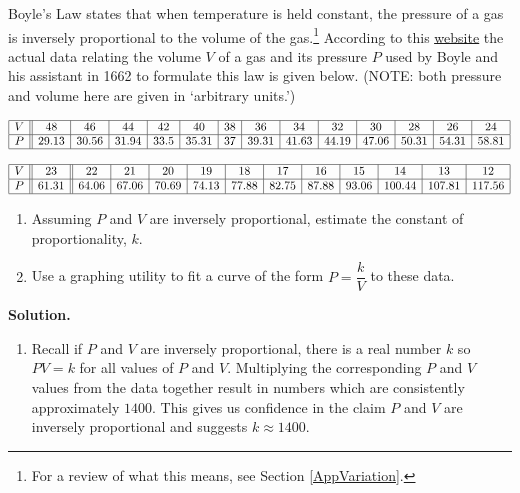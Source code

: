 \documentclass{ximera}
\begin{document}
\begin{example}  \label{BoyleslawRational} Boyle's Law states that when temperature is held constant, the pressure of a gas is inversely proportional to the volume of the gas.\footnote{For a review of what this means, see Section \ref{AppVariation}.}  According to this \href{http://web.lemoyne.edu/~giunta/classicalcs/boyleverify.html}{\underline{website}} the actual data relating the volume $V$ of a gas and its pressure $P$ used by Boyle and his assistant in 1662 to formulate this law is given below. (NOTE: both pressure and volume here are given in `arbitrary units.')

\[ \begin{array}{|c||c|c|c|c|c|c|c|c|c|c|c|c|c|}  \hline

V & 48 & 46 & 44 & 42 & 40 & 38 & 36 & 34 & 32 & 30 & 28 & 26 & 24  \\ \hline

P & 29.13 & 30.56 & 31.94 & 33.5 & 35.31 & 37 & 39.31 & 41.63 & 44.19 & 47.06 & 50.31 & 54.31 & 58.81  \\ \hline \end{array} \]


\[\begin{array}{|c||c||c|c|c|c|c|c|c|c|c|c|c|c|} \hline

V & 23 & 22 & 21 & 20 & 19 & 18 & 17 & 16 & 15 & 14 & 13 & 12  \\ \hline 

P & 61.31 & 64.06 & 67.06 & 70.69 & 74.13 & 77.88 & 82.75 & 87.88 & 93.06 & 100.44 & 107.81 & 117.56   \\ \hline \end{array} \]

\begin{enumerate}

\item Assuming  $P$ and $V$ are inversely proportional, estimate  the constant of proportionality, $k$.

\item Use a graphing utility to fit a curve of the form $P = \dfrac{k}{V}$ to these data.  

\end{enumerate}
 
{\bf Solution.}

\begin{enumerate}

\item Recall if $P$ and $V$ are inversely proportional, there is a real number $k$ so $PV = k$ for all values of $P$ and $V$.  Multiplying the corresponding $P$ and $V$ values from the data together result in numbers which are consistently approximately $1400$.  This gives us confidence in the claim $P$ and $V$ are inversely proportional and suggests $k \approx 1400$.


\end{enumerate}
\end{example}
\end{document}
